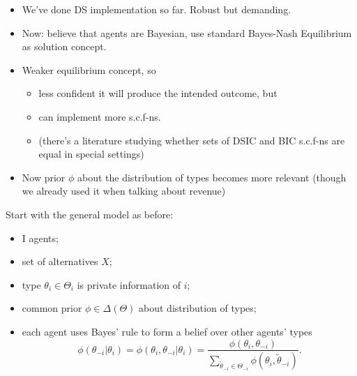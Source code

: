 \documentclass[english]{beamer}		%
\def\lyxframeend{} %
\begin{document}
\begin{itemize}
	\item We've done DS implementation so far. Robust but demanding.
	\item Now: believe that agents are Bayesian, use standard Bayes-Nash Equilibrium as solution concept.
	\pause
	\item Weaker equilibrium concept, so
	\begin{itemize}
		\item less confident it will produce the intended outcome, but
		\item can implement more s.c.f-ns. 
		\item (there's a literature studying whether sets of DSIC and BIC s.c.f-ns are equal in special settings)
	\end{itemize}
	\item Now prior $\phi$ about the distribution of types becomes more relevant (though we already used it when talking about revenue)
\end{itemize}
\lyxframeend


Start with the general model as before:
\begin{itemize}
	\item I agents;
	\item set of alternatives $X$;
	\item type $\theta_{i}\in\Theta_{i}$ is private information of $i$;
	\item common prior $\phi \in \varDelta(\Theta)$ about distribution of types;
	\item each agent uses Bayes' rule to form a belief over other agents' types\\
	$$\phi(\theta_{-i}|\theta_{i}) = \phi(\theta_{i},\theta_{-i}|\theta_{i}) = \frac{\phi(\theta_{i}, \theta_{-i}) }{\sum_{\tilde\theta_{-i}\in\Theta_{-i}} \phi(\theta_{i},\tilde\theta_{-i})}.$$
\end{itemize}
\lyxframeend
\end{document}
